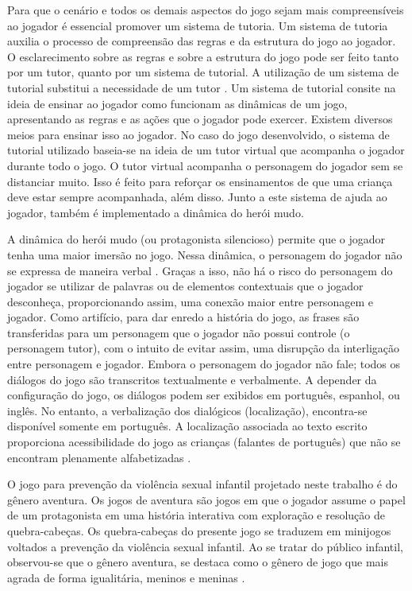 Para que o cenário e todos os demais aspectos do jogo sejam mais compreensíveis ao jogador é essencial promover um sistema de tutoria. Um sistema de tutoria auxilia o processo de compreensão das regras e da estrutura do jogo ao jogador. O esclarecimento sobre as regras e sobre a estrutura do jogo pode ser feito tanto por um tutor, quanto por um sistema de tutorial. A utilização de um sistema de tutorial substitui a necessidade de um tutor \cite{buchinger2014sherlock}. Um sistema de tutorial consite na ideia de  ensinar ao jogador como funcionam as dinâmicas de um jogo, apresentando as regras e as ações que o jogador pode exercer. Existem diversos meios para ensinar isso ao jogador. No caso do jogo desenvolvido, o sistema de tutorial utilizado baseia-se na ideia de um tutor virtual que acompanha o jogador durante todo o jogo. O tutor virtual acompanha o personagem do jogador sem se distanciar muito. Isso é feito para reforçar os ensinamentos de que uma criança deve estar sempre acompanhada, além disso. %
Junto a este sistema de ajuda ao jogador, também é implementado a dinâmica do herói mudo. %

A dinâmica do herói mudo (ou protagonista silencioso) permite que o jogador tenha uma maior imersão no jogo. Nessa dinâmica, o personagem do jogador não se expressa de maneira verbal \cite{domsch2017dialogue}. Graças a isso, não há o risco do personagem do jogador se utilizar de palavras ou de elementos contextuais que o jogador desconheça, proporcionando assim, uma conexão maior entre personagem e jogador. Como artifício, para dar enredo a história do jogo, as frases são transferidas para um personagem que o jogador não possui controle (o personagem tutor), com o intuito de evitar assim, uma disrupção da interligação entre personagem e jogador. Embora o personagem do jogador não fale; todos os diálogos do jogo são transcritos textualmente e verbalmente. A depender da configuração do jogo, os diálogos podem ser exibidos em português, espanhol, ou inglês. No entanto, a verbalização dos dialógicos (localização), encontra-se disponível somente em português. A localização associada ao texto escrito proporciona acessibilidade do jogo as crianças (falantes de português) que não se encontram plenamente alfabetizadas \cite{limeira2015avaliaccao}. 

O jogo para prevenção da violência sexual infantil projetado neste trabalho é do gênero aventura. Os jogos de aventura são jogos em que o jogador assume o papel de um protagonista em uma história interativa com exploração e resolução de quebra-cabeças. Os quebra-cabeças do presente jogo se traduzem em minijogos voltados a prevenção da violência sexual infantil. Ao se tratar do público infantil, observou-se que o gênero aventura, se destaca como o gênero de jogo que mais agrada de forma igualitária, meninos e meninas \cite{brandtzaeg2009children}. 

